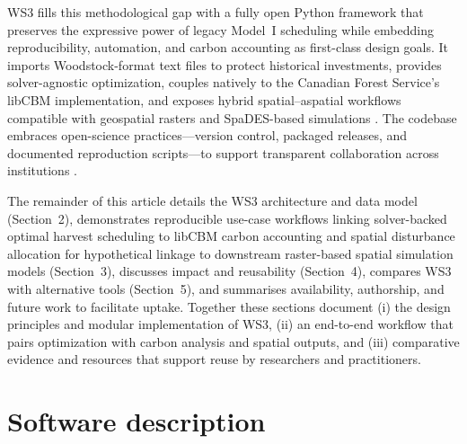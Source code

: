 \documentclass[review]{elsarticle}
\begin{document}
WS3 fills this methodological gap with a fully open Python framework that preserves the expressive power of legacy Model~I scheduling while embedding reproducibility, automation, and carbon accounting as first-class design goals. It imports Woodstock-format text files to protect historical investments, provides solver-agnostic optimization, couples natively to the Canadian Forest Service’s libCBM implementation, and exposes hybrid spatial–aspatial workflows compatible with geospatial rasters and SpaDES-based simulations \citep{remsoft-woodstock, pulp, highs, gurobi, kurz2009cbm, libcbm_py, spades}. The codebase embraces open-science practices—version control, packaged releases, and documented reproduction scripts—to support transparent collaboration across institutions \citep{hampton2015tao, lowndes2017path}.

The remainder of this article details the WS3 architecture and data model (Section~2), demonstrates reproducible use-case workflows linking solver-backed optimal harvest scheduling to libCBM carbon accounting and spatial disturbance allocation for hypothetical linkage to downstream raster-based spatial simulation models (Section~3), discusses impact and reusability (Section~4), compares WS3 with alternative tools (Section~5), and summarises availability, authorship, and future work to facilitate uptake. Together these sections document (i) the design principles and modular implementation of WS3, (ii) an end-to-end workflow that pairs optimization with carbon analysis and spatial outputs, and (iii) comparative evidence and resources that support reuse by researchers and practitioners.

\section{Software description}
\end{document}
